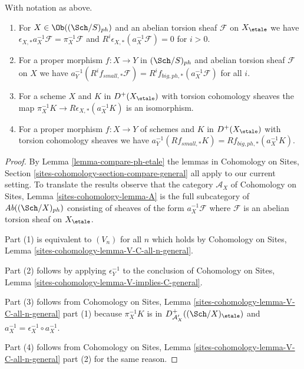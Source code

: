 \begin{lemma}
\label{lemma-V-C-all-n-etale-ph}
With notation as above.
\begin{enumerate}
\item For $X \in \Ob((\Sch/S)_{ph})$ and an abelian torsion sheaf $\mathcal{F}$
on $X_\etale$ we have
$\epsilon_{X, *}a_X^{-1}\mathcal{F} = \pi_X^{-1}\mathcal{F}$
and $R^i\epsilon_{X, *}(a_X^{-1}\mathcal{F}) = 0$ for $i > 0$.
\item For a proper morphism $f : X \to Y$ in $(\Sch/S)_{ph}$
and abelian torsion sheaf $\mathcal{F}$ on $X$ we have
$a_Y^{-1}(R^if_{small, *}\mathcal{F}) =
R^if_{big, ph, *}(a_X^{-1}\mathcal{F})$
for all $i$.
\item For a scheme $X$ and $K$ in $D^+(X_\etale)$ with torsion
cohomology sheaves the map
$\pi_X^{-1}K \to R\epsilon_{X, *}(a_X^{-1}K)$ is an isomorphism.
\item For a proper morphism $f : X \to Y$ of schemes
and $K$ in $D^+(X_\etale)$ with torsion cohomology sheaves we have
$a_Y^{-1}(Rf_{small, *}K) = Rf_{big, ph, *}(a_X^{-1}K)$.
\end{enumerate}
\end{lemma}

\begin{proof}
By Lemma \ref{lemma-compare-ph-etale} the lemmas in
Cohomology on Sites, Section \ref{sites-cohomology-section-compare-general}
all apply to our current setting. To translate the results
observe that the category $\mathcal{A}_X$ of
Cohomology on Sites, Lemma \ref{sites-cohomology-lemma-A}
is the full subcategory of $\textit{Ab}((\Sch/X)_{ph})$
consisting of sheaves of the form $a_X^{-1}\mathcal{F}$
where $\mathcal{F}$ is an abelian torsion sheaf on $X_\etale$.

\medskip\noindent
Part (1) is equivalent to $(V_n)$ for all $n$ which holds by
Cohomology on Sites, Lemma \ref{sites-cohomology-lemma-V-C-all-n-general}.

\medskip\noindent
Part (2) follows by applying $\epsilon_Y^{-1}$ to the conclusion of
Cohomology on Sites, Lemma \ref{sites-cohomology-lemma-V-implies-C-general}.

\medskip\noindent
Part (3) follows from Cohomology on Sites, Lemma
\ref{sites-cohomology-lemma-V-C-all-n-general} part (1)
because $\pi_X^{-1}K$ is in $D^+_{\mathcal{A}'_X}((\Sch/X)_\etale)$
and $a_X^{-1} = \epsilon_X^{-1} \circ a_X^{-1}$.

\medskip\noindent
Part (4) follows from Cohomology on Sites, Lemma
\ref{sites-cohomology-lemma-V-C-all-n-general} part (2)
for the same reason.
\end{proof}


